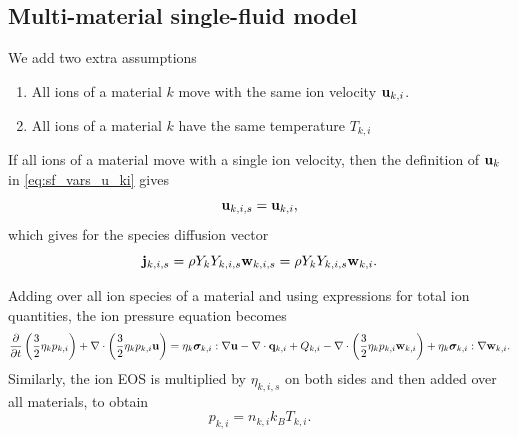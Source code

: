 \documentclass[a4paper,11pt]{report}
\begin{document}
\subsection{Multi-material single-fluid model}
\label{sec:sf_mm_ms}

We add two extra assumptions
\begin{enumerate}
    \item All ions of a material $k$ move with the same ion velocity $\mathbf{u}_{k,i}$. \label{eq:single_ion_vel}
    \item All ions of a material $k$ have the same temperature $T_{k,i}$ \label{eq:single_ion_T}
\end{enumerate}

If all ions of a material move with a single ion velocity, then the definition of $\mathbf{u}_k$ in \cref{eq:sf_vars_u_ki} gives 
\begin{equation}
    \mathbf{u}_{k,i,s} = \mathbf{u}_{k,i},
\end{equation} 
which gives for the species diffusion vector
\begin{equation}
    \label{sec:sf_mm_ms_diffusion}
    \mathbf{j}_{k,i,s} = \rho Y_k Y_{k,i,s} \mathbf{w}_{k,i,s} = \rho Y_k Y_{k,i,s} \mathbf{w}_{k,i}.
\end{equation} 

Adding over all ion species of a material and using expressions for total ion quantities, the ion pressure equation becomes
\begin{equation*}
    \frac{\partial}{\partial t} \left( \frac{3}{2} \eta_k p_{k,i} \right) + \nabla \cdot \left( \frac{3}{2} \eta_k p_{k,i} \mathbf{u} \right) = \\ 
    \eta_k \bm \sigma_{k,i} : \nabla \mathbf{u} - \nabla \cdot \mathbf{q}_{k,i} + Q_{k,i} - \nabla \cdot \left( \frac{3}{2} \eta_k p_{k,i} \mathbf{w}_{k,i} \right) + \eta_k \bm \sigma_{k,i} : \nabla \mathbf{w}_{k,i}.
\end{equation*}
Similarly, the ion EOS is multiplied by $\eta_{k,i,s}$ on both sides and then added over all materials, to obtain
\begin{equation}
    p_{k,i} = n_{k,i} k_B T_{k,i}.
\end{equation}
\end{document}
